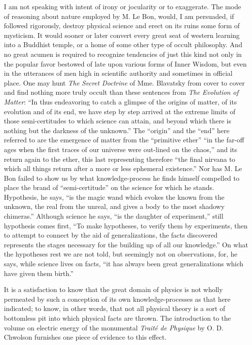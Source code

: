 \documentclass[a4paper, 11pt, oneside, polutonikogreek, english]{article}
\begin{document}
I am not speaking with intent of irony or jocularity or to exaggerate. The mode of reasoning about nature employed by M. Le Bon, would, I am persuaded, if followed rigorously, destroy physical science and erect on its ruins some form of mysticism. It would sooner or later convert every great seat of western learning into a Buddhist temple, or a home of some other type of occult philosophy. And no great acumen is required to recognize tendencies of just this kind not only in the popular favor bestowed of late upon various forms of Inner Wisdom, but even in the utterances of men high in scientific authority and sometimes in official place. One may hunt \emph{The Secret Doctrine} of Mme. Blavatsky from cover to cover and find nothing more truly occult than these sentences from \emph{The Evolution of Matter}: ``In thus endeavoring to catch a glimpse of the origins of matter, of its evolution and of its end, we have step by step arrived at the extreme limits of those semi-certitudes to which science can attain, and beyond which there is nothing but the darkness of the unknown.'' The ``origin'' and the ``end'' here referred to are the emergence of matter from the ``primitive ether'' ``in the far-off ages when the first traces of our universe were out-lined on the chaos,'' and its return again to the ether, this last representing therefore ``the final nirvana to which all things return after a more or less ephemeral existence.'' Nor has M. Le Bon failed to show us by what knowledge-process he finds himself compelled to place the brand of ``semi-certitude'' on the science for which he stands. Hypothesis, he says, ``is the magic wand which evokes the known from the unknown, the real from the unreal, and gives a body to the most shadowy chimeras.'' Although science he says, ``is the daughter of experiment,'' still hypothesis comes first, ``To make hypotheses, to verify them by experiments, then to attempt to connect by the aid of generalizations, the facts discovered represents the stages necessary for the building up of all our knowledge.'' On what the hypotheses rest we are not told, but seemingly not on observations, for, he says, while science lives on facts, ``it has always been great generalizations which have given them birth.''

It is a satisfaction to know that the great domain of physics is not wholly permeated by such a conception of its own knowledge-processes as that here indicated; to know, in other words, that not all physical theory is a sort of bottomless pit into which physical facts are thrown. The introduction to the volume on electric energy of the monumental \emph{Traité de Physique} by O. D. Chwolson furnishes one piece of evidence to this effect.
\end{document}
